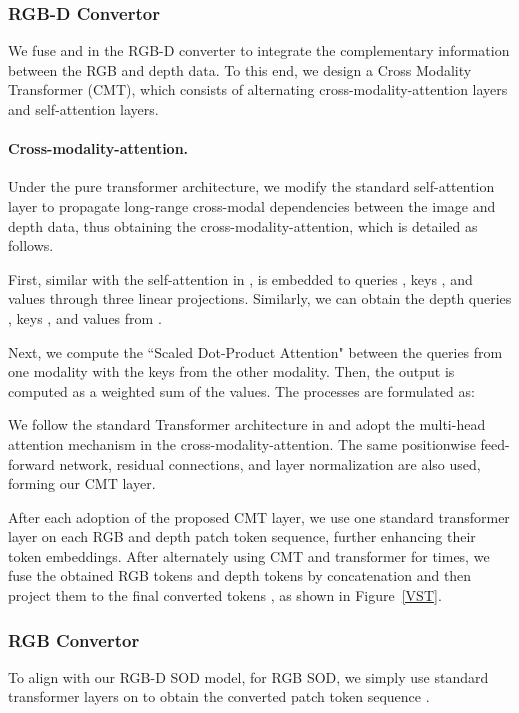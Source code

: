 \documentclass[10pt,twocolumn,letterpaper]{article}
\begin{document}
\subsubsection{RGB-D Convertor}
We fuse  and  in the RGB-D converter to integrate the complementary information between the RGB and depth data.
To this end, we design a Cross Modality Transformer (CMT), which consists of  alternating cross-modality-attention layers and self-attention layers.


\vspace{-3mm}
\paragraph{Cross-modality-attention.}
Under the pure transformer architecture, we modify the standard self-attention layer to propagate long-range cross-modal dependencies between the image and depth data, thus obtaining the cross-modality-attention, which is detailed as follows.

First, similar with the self-attention in \cite{vaswani2017attention},  is embedded to queries , keys , and values  through three linear projections.
Similarly, we can obtain the depth queries , keys , and values  from .


Next, we compute the ``Scaled Dot-Product Attention" \cite{vaswani2017attention} between the queries from one modality with the keys from the other modality. Then, the output is computed as a weighted sum of the values. The processes are formulated as:


We follow the standard Transformer architecture in \cite{vaswani2017attention} and adopt the multi-head attention mechanism in the cross-modality-attention. The same positionwise feed-forward network, residual connections, and layer normalization \cite{ba2016layer} are also used, forming our CMT layer.




After each adoption of the proposed CMT layer, we use one standard transformer layer 
on each RGB and depth patch token sequence, further enhancing their token embeddings. After alternately using CMT and transformer for  times, we fuse the obtained RGB tokens and depth tokens by concatenation and then project them to the final converted tokens , as shown in Figure~\ref{VST}.


\subsubsection{RGB Convertor}
To align with our RGB-D SOD model, for RGB SOD, we simply use  standard transformer layers on  to obtain the converted patch token sequence .
\end{document}
